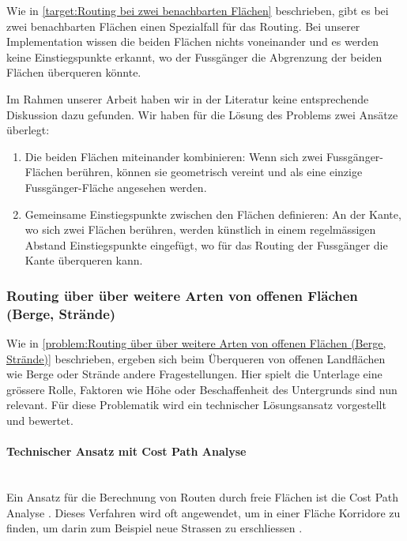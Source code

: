Wie in \ref{target:Routing bei zwei benachbarten Flächen} beschrieben, gibt es bei zwei benachbarten Flächen einen Spezialfall für das Routing. Bei unserer Implementation wissen die beiden Flächen nichts voneinander und es werden keine Einstiegspunkte erkannt, wo der Fussgänger die Abgrenzung der beiden Flächen überqueren könnte.

Im Rahmen unserer Arbeit haben wir in der Literatur keine entsprechende Diskussion dazu gefunden. Wir haben für die Lösung des Problems zwei Ansätze überlegt:

\begin{enumerate}
    \item Die beiden Flächen miteinander kombinieren: Wenn sich zwei Fussgänger-Flächen berühren, können sie geometrisch vereint und als eine einzige Fussgänger-Fläche angesehen werden.
    \item Gemeinsame Einstiegspunkte zwischen den Flächen definieren: An der Kante, wo sich zwei Flächen berühren, werden künstlich in einem regelmässigen Abstand Einstiegspunkte eingefügt, wo für das Routing der Fussgänger die Kante überqueren kann.
\end{enumerate}


\subsubsection{Routing über über weitere Arten von offenen Flächen (Berge, Strände)}
\label{subsub:Routing über über weitere Arten von offenen Flächen (Berge, Strände)}

Wie in \ref{problem:Routing über über weitere Arten von offenen Flächen (Berge, Strände)} beschrieben, ergeben sich beim Überqueren von offenen Landflächen wie Berge oder Strände andere Fragestellungen. Hier spielt die Unterlage eine grössere Rolle, Faktoren wie Höhe oder Beschaffenheit des Untergrunds sind nun relevant. Für diese Problematik wird ein technischer Lösungsansatz vorgestellt und bewertet.

\paragraph{Technischer Ansatz mit Cost Path Analyse}~\\
Ein Ansatz für die Berechnung von Routen durch freie Flächen ist die Cost Path Analyse \cite{cost_path_analysis}. Dieses Verfahren wird oft angewendet, um in einer Fläche Korridore zu finden, um darin zum Beispiel neue Strassen zu erschliessen \cite{gis-wiki:cost-path-analysis}.


